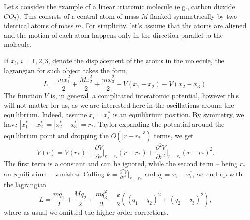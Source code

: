 \documentclass[english,fontsize=11pt,paper=a5,oneside]{scrbook}
\theoremstyle{definition}
\begin{document}
Let's consider the example of a linear triatomic molecule (e.g., carbon dioxide $CO_2$).
This consists of a central atom of mass $M$ flanked symmetrically by two identical atoms of mass $m$.
For simplicity, let's assume that the atoms are aligned and the motion of each atom happens only in the direction parallel to the molecule.

If $x_i$, $i=1,2,3$, denote the displacement of the atoms in the molecule, the lagrangian for such object takes the form,
\begin{equation}
  L = \frac{m\dot x_1^2}2 + \frac{M\dot x_2^2}2 + \frac{m\dot x_3^2}2
  - V(x_1 - x_2) - V(x_2 - x_3).
\end{equation}
The function $V$ is, in general, a complicated interatomic potential, however this will not matter for us, as we are interested here in the oscillations around the equilibrium.
Indeed, assume $x_i = x_i^*$ is an equilibrium position. By symmetry, we have $|x_1^*-x_2^*| = |x_2^* - x_3^*| = r_*$.
Taylor expanding the potential around the equilibrium point and dropping the $O\left(|r-r_*|^3\right)$ terms, we get
\begin{equation}
  V(r) = V(r_*) + \frac{\partial V}{\partial r}\Big|_{r=r_*}(r-r_*) + \frac{\partial^2 V}{\partial r^2}\Big|_{r=r_*}(r-r_*)^2.
\end{equation}
The first term is a constant and can be ignored, while the second term -- being $r_*$ an equilibrium -- vanishes. Calling $k = \frac{\partial^2 V}{\partial r^2}\big|_{r=r_*}$ and $q_i = x_i - x_i^*$, we end up with the lagrangian
\begin{equation}
  L  = \frac{m \dot q_1}{2} + \frac{M \dot q_2}{2} + \frac{m\dot q_3^2}2 - \frac k2 \left((q_1 - q_2)^2 + (q_2 - q_3)^2\right),
\end{equation}
where as usual we omitted the higher order corrections.
\end{document}
